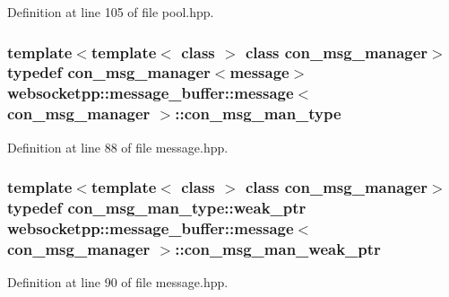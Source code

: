 Definition at line 105 of file pool.\+hpp.

\hypertarget{classwebsocketpp_1_1message__buffer_1_1message_a30657669d087f13475246f946d6b6361}{}
\subsubsection[{con\+\_\+msg\+\_\+man\+\_\+type}]{\setlength{\rightskip}{0pt plus 5cm}template$<$template$<$ class $>$ class con\+\_\+msg\+\_\+manager$>$ typedef con\+\_\+msg\+\_\+manager$<${\bf message}$>$ {\bf websocketpp\+::message\+\_\+buffer\+::message}$<$ con\+\_\+msg\+\_\+manager $>$\+::{\bf con\+\_\+msg\+\_\+man\+\_\+type}}\label{classwebsocketpp_1_1message__buffer_1_1message_a30657669d087f13475246f946d6b6361}


Definition at line 88 of file message.\+hpp.

\hypertarget{classwebsocketpp_1_1message__buffer_1_1message_a54e04850b167306ef4e04ac2612e5c18}{}
\subsubsection[{con\+\_\+msg\+\_\+man\+\_\+weak\+\_\+ptr}]{\setlength{\rightskip}{0pt plus 5cm}template$<$template$<$ class $>$ class con\+\_\+msg\+\_\+manager$>$ typedef con\+\_\+msg\+\_\+man\+\_\+type\+::weak\+\_\+ptr {\bf websocketpp\+::message\+\_\+buffer\+::message}$<$ con\+\_\+msg\+\_\+manager $>$\+::{\bf con\+\_\+msg\+\_\+man\+\_\+weak\+\_\+ptr}}\label{classwebsocketpp_1_1message__buffer_1_1message_a54e04850b167306ef4e04ac2612e5c18}


Definition at line 90 of file message.\+hpp.

\hypertarget{classwebsocketpp_1_1message__buffer_1_1message_adb52b5feb820ec7bc6140cc8be9edd57}{}
